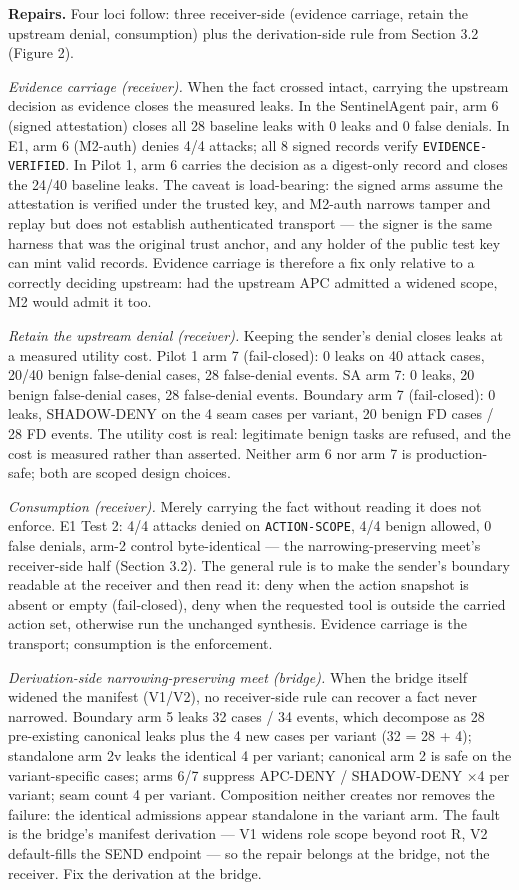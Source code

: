 \documentclass[
  10pt,
]{article}
\let\origtexttt\texttt
\renewcommand{\texttt}[1]{{\upshape\origtexttt{#1}}}
\renewcommand{\_}{\origunderscore\allowbreak}
\begin{document}
\textbf{Repairs.} Four loci follow: three receiver-side (evidence
carriage, retain the upstream denial, consumption) plus the
derivation-side rule from Section 3.2 (Figure 2).

\emph{Evidence carriage (receiver).} When the fact crossed intact,
carrying the upstream decision as evidence closes the measured leaks. In
the SentinelAgent pair, arm 6 (signed attestation) closes all 28
baseline leaks with 0 leaks and 0 false denials. In E1, arm 6 (M2-auth)
denies 4/4 attacks; all 8 signed records verify
\texttt{EVIDENCE-VERIFIED}. In Pilot 1, arm 6 carries the decision as a
digest-only record and closes the 24/40 baseline leaks. The caveat is
load-bearing: the signed arms assume the attestation is verified under
the trusted key, and M2-auth narrows tamper and replay but does not
establish authenticated transport --- the signer is the same harness
that was the original trust anchor, and any holder of the public test
key can mint valid records. Evidence carriage is therefore a fix only
relative to a correctly deciding upstream: had the upstream APC admitted
a widened scope, M2 would admit it too.

\emph{Retain the upstream denial (receiver).} Keeping the sender's
denial closes leaks at a measured utility cost. Pilot 1 arm 7
(fail-closed): 0 leaks on 40 attack cases, 20/40 benign false-denial
cases, 28 false-denial events. SA arm 7: 0 leaks, 20 benign false-denial
cases, 28 false-denial events. Boundary arm 7 (fail-closed): 0 leaks,
SHADOW-DENY on the 4 seam cases per variant, 20 benign FD cases / 28 FD
events. The utility cost is real: legitimate benign tasks are refused,
and the cost is measured rather than asserted. Neither arm 6 nor arm 7
is production-safe; both are scoped design choices.

\emph{Consumption (receiver).} Merely carrying the fact without reading
it does not enforce. E1 Test 2: 4/4 attacks denied on
\texttt{ACTION-SCOPE}, 4/4 benign allowed, 0 false denials, arm-2
control byte-identical --- the narrowing-preserving meet's receiver-side
half (Section 3.2). The general rule is to make the sender's boundary
readable at the receiver and then read it: deny when the action snapshot
is absent or empty (fail-closed), deny when the requested tool is
outside the carried action set, otherwise run the unchanged synthesis.
Evidence carriage is the transport; consumption is the enforcement.

\emph{Derivation-side narrowing-preserving meet (bridge).} When the
bridge itself widened the manifest (V1/V2), no receiver-side rule can
recover a fact never narrowed. Boundary arm 5 leaks 32 cases / 34
events, which decompose as 28 pre-existing canonical leaks plus the 4
new cases per variant (32 = 28 + 4); standalone arm 2v leaks the
identical 4 per variant; canonical arm 2 is safe on the variant-specific
cases; arms 6/7 suppress APC-DENY / SHADOW-DENY ×4 per variant; seam
count 4 per variant. Composition neither creates nor removes the
failure: the identical admissions appear standalone in the variant arm.
The fault is the bridge's manifest derivation --- V1 widens role scope
beyond root R, V2 default-fills the SEND endpoint --- so the repair
belongs at the bridge, not the receiver. Fix the derivation at the
bridge.
\end{document}
